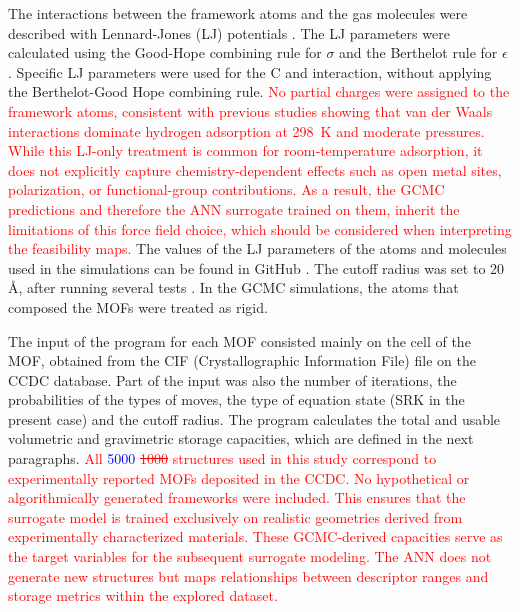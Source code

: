 \documentclass[review]{elsarticle}
\begin{document}
The interactions between the framework atoms and the gas molecules were 
described with Lennard-Jones (LJ) potentials \cite{lennard24}. The LJ 
parameters were calculated using the Good-Hope combining rule for $\sigma$ 
\cite{gh70} and the Berthelot rule for $\epsilon$ \cite{berthelot1898}. 
Specific LJ parameters were used for the C and  interaction, without 
applying the Berthelot-Good Hope combining rule. \textcolor{red}{No partial 
charges were assigned to the framework atoms, consistent with 
previous studies showing that van der Waals interactions dominate hydrogen 
adsorption at 298~K and moderate pressures. While this LJ-only treatment is 
common for room‑temperature adsorption, it does not explicitly capture 
chemistry‑dependent effects such as open metal sites, polarization, or 
functional-group contributions. As a result, the GCMC predictions and therefore 
the ANN surrogate trained on them, inherit the limitations of this force field 
choice, which should be considered when interpreting the feasibility maps.}
The values of the LJ 
parameters of the atoms and molecules used in the simulations can be found in 
GitHub \cite{mcmgs}. The cutoff radius was set to 20 \AA{}, after running 
several tests \cite{cc22,gc24,gc24a}. In the GCMC simulations, the atoms that 
composed the MOFs were treated as rigid. 

The input of the program for each MOF consisted mainly on the cell of the 
MOF, obtained from the CIF (Crystallographic Information File) file on the 
CCDC database. Part of the input was also the number of iterations, the 
probabilities of the types of moves, the type of equation state (SRK in the 
present case) and the cutoff radius. The program calculates the total and 
usable volumetric and gravimetric storage capacities, which are defined in 
the next paragraphs. \textcolor{red}{All \textcolor{blue}{5000} \sout{1000} structures used in this study 
correspond to experimentally reported MOFs deposited in the CCDC. No hypothetical or algorithmically generated frameworks were included. This ensures that the surrogate model is trained exclusively on realistic geometries derived from experimentally characterized materials.
These GCMC-derived capacities serve as the target variables for the subsequent surrogate modeling. The ANN does not generate new structures but maps relationships between descriptor ranges and storage metrics within the explored dataset.
}
 
\end{document}
